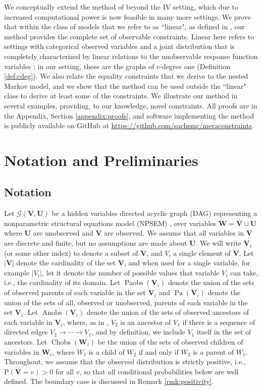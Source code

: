 \documentclass[12pt]{article}
\def\Pr{{\mathrm{P}}}
\DeclareMathOperator{\Anobs}{Anobs}
\DeclareMathOperator{\Paobs}{Paobs}
\DeclareMathOperator{\Chobs}{Chobs}
\newcommand{\bW}{\boldsymbol{W}}
\newcommand{\bU}{\boldsymbol{U}}
\newcommand{\bV}{\boldsymbol{V}}
\DeclareMathOperator{\Pa}{Pa}
\begin{document}
We conceptually extend the method of \citet{bonet2001instrumentality} beyond the IV setting, which due to increased computational power is now feasible in many more settings. We prove that within the class of models that we refer to as ``linear", as defined in \citet{duarte2023automated}, our method provides the complete set of observable constraints. Linear here refers to settings with categorical observed variables and a joint distribution that is completely characterized by linear relations to the unobservable response function variables \citep{balke1994counterfactual, sachs2023general}; in our setting, these are the graphs of c-degree one (Definition \ref{def:cdeg}). We also relate the equality constraints that we derive to the nested Markov model, and we show that the method can be used outside the ``linear" class to derive at least some of the constraints. We illustrate our method in several examples, providing, to our knowledge, novel constraints. All proofs are in the Appendix, Section \ref{appendix:proofs}, and software implementing the method is publicly available on GitHub at \url{https://github.com/sachsmc/meraconstraints}.



\section{Notation and Preliminaries}
\subsection{Notation}
Let $\mathcal{G}(\bV, \bU)$ be a hidden variables directed acyclic graph (DAG) representing a nonparametric structural equations model (NPSEM) \citep{Pearl2000causality}, over variables $\bW = \bV \cup \bU$ where $\bU$ are unobserved and $\bV$ are observed. We assume that all variables in $\bV$ are discrete and finite, but no assumptions are made about $\bU$. We will write $\bV_i$ (or some other index) to denote a subset of $\bV$, and $V_i$ a single element of $\bV$. Let $|\bV|$ denote the cardinality of the set $\bV$, and when used for a single variable, for example $|V_i|$, let it denote the number of possible values that variable $V_i$ can take, i.e., the cardinality of its domain. Let $\Paobs(\bV_i)$ denote the union of the sets of observed parents of each variable in the set $\bV_i$ and $\Pa(\bV_i)$ denote the union of the sets of all, observed or unobserved, parents of each variable in the set $\bV_i$. Let $\Anobs(\bV_i)$ denote the union of the sets of observed ancestors of each variable in $\bV_i$, where, as in \citet{evans2019smooth}, $V_2$ is an ancestor of $V_1$ if there is a sequence of directed edges $V_2 \rightarrow \cdots \rightarrow V_1$, and by definition, we include $V_1$ itself in the set of ancestors. Let $\Chobs(\bW_i)$ be the union of the sets of observed children of variables in $\bW_i$, where $W_1$ is a child of $W_2$ if and only if $W_2$ is a parent of $W_1$. Throughout, we assume that the observed distribution is strictly positive, i.e., $\Pr(\bV = v) > 0$ for all $v$, so that all conditional probabilities below are well defined. The boundary case is discussed in Remark \ref{rmk:positivity}.
\end{document}
